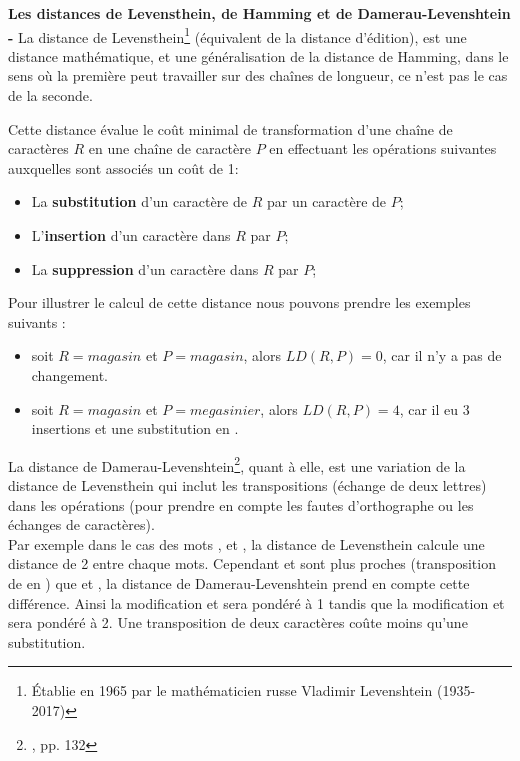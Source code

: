 \textbf{Les distances de Levensthein, de Hamming et de Damerau-Levenshtein -} La distance de Levensthein\footnote{Établie en 1965 par le mathématicien russe Vladimir Levenshtein (1935-2017)} (équivalent de la distance d'édition), est une distance mathématique, et une généralisation de la distance de Hamming, dans le sens où la première peut travailler sur des chaînes de longueur, ce n'est pas le cas de la seconde.

Cette distance évalue le coût minimal de transformation d'une chaîne de caractères $R$ en une chaîne de caractère $P$ en effectuant les opérations suivantes auxquelles sont associés un coût de 1:

\begin{itemize}
    \item La \textbf{substitution} d'un caractère de $R$ par un caractère de $P$;
    \item L'\textbf{insertion} d'un caractère dans $R$ par $P$;
    \item La \textbf{suppression} d'un caractère dans $R$ par $P$;
\end{itemize}

Pour illustrer le calcul de cette distance nous pouvons prendre les exemples suivants :

\begin{itemize}
    \item soit $R = magasin$ et $P= magasin$, alors $LD(R, P) = 0$, car il n'y a pas de changement.
    \item soit $R = magasin$ et $P= megasinier $, alors $LD(R, P) = 4$, car il eu 3 insertions  et une substitution  en . 
\end{itemize} 
\bigskip
La distance de Damerau-Levenshtein\footnote{\cite{chaumartin_traitement_2020}, pp. 132}, quant à elle, est une variation de la distance de Levensthein qui inclut les transpositions (échange de deux lettres) dans les opérations (pour prendre en compte les fautes d'orthographe ou les échanges de caractères).\\ 

Par exemple dans le cas des mots ,  et , la distance de Levensthein calcule une distance de 2 entre chaque mots. Cependant  et  sont plus proches (transposition de  en ) que  et , la distance de Damerau-Levenshtein prend en compte cette différence. Ainsi la modification  et  sera pondéré à 1 tandis que la modification  et  sera pondéré à 2. Une transposition de deux caractères coûte moins qu'une substitution. 

